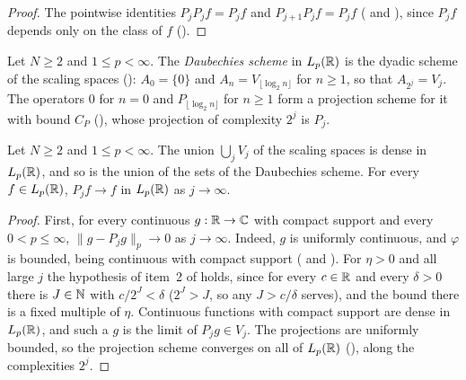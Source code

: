 \begin{proof}
\leanok
{}
The pointwise identities $P_j P_j f = P_j f$ and $P_{j+1} P_j f = P_j f$
( and ), since $P_j f$ depends only on
the class of $f$ ().
\end{proof}

\begin{definition}
\label{def:daub-scheme}
\leanok
{}
Let $N \geq 2$ and $1 \leq p < \infty$. The \emph{Daubechies scheme} in $L_p(\mathbb{R})$ is the dyadic
scheme of the scaling spaces (): $A_0 = \{0\}$ and
$A_n = V_{\lfloor \log_2 n \rfloor}$ for $n \geq 1$, so that $A_{2^j} = V_j$. The operators $0$
for $n = 0$ and $P_{\lfloor \log_2 n \rfloor}$ for $n \geq 1$ form a projection scheme for it with
bound $C_P$ (), whose projection of complexity $2^j$ is $P_j$.
\end{definition}

\begin{theorem}
\label{thm:daub-density}
\leanok
{}
Let $N \geq 2$ and $1 \leq p < \infty$. The union $\bigcup_j V_j$ of the scaling spaces is dense
in $L_p(\mathbb{R})$, and so is the union of the sets of the Daubechies scheme. For every
$f \in L_p(\mathbb{R})$, $P_j f \to f$ in $L_p(\mathbb{R})$ as $j \to \infty$.
\end{theorem}

\begin{proof}
\leanok
{}
First, for every continuous $g : \mathbb{R} \to \mathbb{C}$ with compact support and every $0 < p \leq \infty$,
$\|g - P_j g\|_p \to 0$ as $j \to \infty$. Indeed, $g$ is uniformly continuous, and $\varphi$ is
bounded, being continuous with compact support
( and ). For $\eta > 0$ and all
large $j$ the hypothesis of item~2 of  holds, since for every $c \in \mathbb{R}$
and every $\delta > 0$ there is $J \in \mathbb{N}$ with $c/2^J < \delta$ ($2^J > J$, so any
$J > c/\delta$ serves), and the bound there is a fixed multiple of $\eta$. Continuous functions
with compact support are dense in $L_p(\mathbb{R})$, and such a $g$ is the limit of $P_j g \in V_j$. The
projections are uniformly bounded, so the projection scheme converges on all of $L_p(\mathbb{R})$
(), along the complexities $2^j$.
\end{proof}

